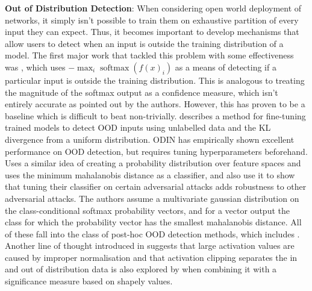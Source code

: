 \documentclass{article}
\DeclareMathOperator{\softmax}{softmax}
\begin{document}
            \textbf{Out of Distribution Detection}: When considering open world deployment of networks, it simply isn't possible to train them on exhaustive partition of every input they can expect. Thus, it becomes important to develop mechanisms that allow users to detect when an input is outside the training distribution of a model. The first major work that tackled this problem with some effectiveness was \cite{hendrycks2018baselinedetectingmisclassifiedoutofdistribution}, which uses $-\max_i \softmax(f(x)_i)$ as a means of detecting if a particular input is outside the training distribution. This is analogous to treating the magnitude of the softmax output as a confidence measure, which isn't entirely accurate as pointed out by the authors. However, this has proven to be a baseline which is difficult to beat non-trivially. \cite{hendrycks2019deepanomalydetectionoutlier} describes a method for fine-tuning trained models to detect OOD inputs using unlabelled data and the KL divergence from a uniform distribution. ODIN \cite{liang2020enhancingreliabilityoutofdistributionimage} has empirically shown excellent performance on OOD detection, but requires tuning hyperparameters beforehand. \cite{lee2018simpleunifiedframeworkdetecting} Uses a similar idea of creating a probability distribution over feature spaces and uses the minimum mahalanobis distance as a classifier, and also use it to show that tuning their classifier on certain adversarial attacks adds robustness to other adversarial attacks. The authors assume a multivariate gaussian distribution on the class-conditional softmax probability vectors, and for a vector output the class for which the probability vector has the smallest mahalanobis distance. All of these fall into the class of post-hoc OOD detection methods, which includes \cite{liu2021energybasedoutofdistributiondetection, sun2022diceleveragingsparsificationoutofdistribution, morteza2021provableguaranteesunderstandingoutofdistribution}. Another line of thought introduced in \cite{sun2021reactoutofdistributiondetectionrectified} suggests that large activation values are caused by improper normalisation and that activation clipping separates the in and out of distribution data is also explored by \cite{ahn2023lineoutofdistributiondetectionleveraging} when combining it with a significance measure based on shapely values.
            
\end{document}
